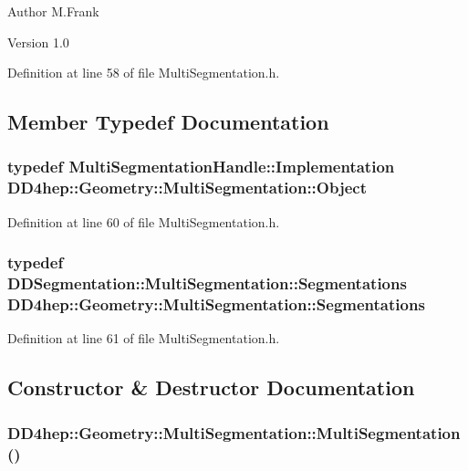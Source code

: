 \begin{DoxyAuthor}{Author}
M.Frank 
\end{DoxyAuthor}
\begin{DoxyVersion}{Version}
1.0 
\end{DoxyVersion}


Definition at line 58 of file MultiSegmentation.h.

\subsection{Member Typedef Documentation}
\hypertarget{class_d_d4hep_1_1_geometry_1_1_multi_segmentation_ab30207d7b5e4366c7227de5743a88452}{
\subsubsection[{Object}]{\setlength{\rightskip}{0pt plus 5cm}typedef {\bf MultiSegmentationHandle::Implementation} {\bf DD4hep::Geometry::MultiSegmentation::Object}}}
\label{class_d_d4hep_1_1_geometry_1_1_multi_segmentation_ab30207d7b5e4366c7227de5743a88452}


Definition at line 60 of file MultiSegmentation.h.\hypertarget{class_d_d4hep_1_1_geometry_1_1_multi_segmentation_ae2c7165290144f20af27248eab1858c5}{
\subsubsection[{Segmentations}]{\setlength{\rightskip}{0pt plus 5cm}typedef {\bf DDSegmentation::MultiSegmentation::Segmentations} {\bf DD4hep::Geometry::MultiSegmentation::Segmentations}}}
\label{class_d_d4hep_1_1_geometry_1_1_multi_segmentation_ae2c7165290144f20af27248eab1858c5}


Definition at line 61 of file MultiSegmentation.h.

\subsection{Constructor \& Destructor Documentation}
\hypertarget{class_d_d4hep_1_1_geometry_1_1_multi_segmentation_a97c6e80bf6021fd636b9daa02a51e500}{
\subsubsection[{MultiSegmentation}]{\setlength{\rightskip}{0pt plus 5cm}DD4hep::Geometry::MultiSegmentation::MultiSegmentation ()}}
\label{class_d_d4hep_1_1_geometry_1_1_multi_segmentation_a97c6e80bf6021fd636b9daa02a51e500}


